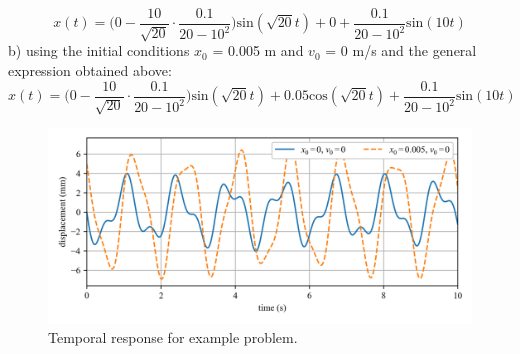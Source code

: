 \documentclass[12pt,letter]{article}
\begin{document}
\begin{example}
\begin{equation}
		x(t) = \Big(0-\frac{10}{\sqrt{20}}\cdot \frac{0.1}{20-10^2}\Big)\text{sin}(\sqrt{20} t) + 0 + \frac{0.1}{20-10^2}\text{sin}(10 t)
	\end{equation}			
	b) using the initial conditions $x_0$ = 0.005 m and $v_0$ = 0 m/s and the general expression obtained above:
	\begin{equation}
		x(t) = \Big(0-\frac{10}{\sqrt{20}}\cdot \frac{0.1}{20-10^2}\Big)\text{sin}(\sqrt{20} t) + 0.05\text{cos}(\sqrt{20} t) + \frac{0.1}{20-10^2}\text{sin}(10 t)
	\end{equation}			
	\begin{figure}[H]
		\centering
		\includegraphics[width=1.0\textwidth]{../figures/response_1-DOF-spring_mass_forced.png}
		\caption{Temporal response for example problem.}
	\end{figure}
\end{example}
\end{document}
